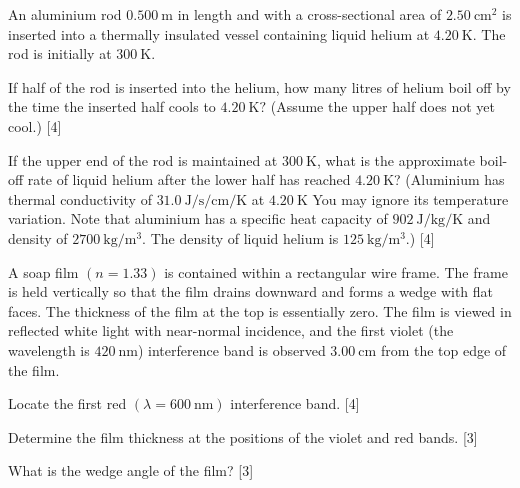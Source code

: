 \begin{problem}
    An aluminium rod $\qty{0.500}{\m}$ in length and with a cross-sectional area of $\qty{2.50}{\square\cm}$ is inserted into a thermally insulated vessel containing liquid helium at $\qty{4.20}{\K}$. The rod is initially at $\qty{300}{\K}$.
    \begin{subproblem}
        If half of the rod is inserted into the helium, how many litres of helium boil off by the time the inserted half cools to $4.20 \mathrm{~K} ?$ (Assume the upper half does not yet cool.)
    \hfill{[4]}\end{subproblem}
    \begin{subproblem}
        If the upper end of the rod is maintained at $\qty{300}{\K}$, what is the approximate boil-off rate of liquid helium after the lower half has reached $\qty{4.20}{\K}$? (Aluminium has thermal conductivity of $\qty{31.0}{\J\per\s\per\cm\per\K}$ at $\qty{4.20}{\K}$ You may ignore its temperature variation. Note that aluminium has a specific heat capacity of $\qty{902}{\J\per\kg\per\K}$ and density of $\qty{2700}{\kg\per\cubic\m}$. The density of liquid helium is $\qty{125}{\kg\per\cubic\m}$.)
    \hfill{[4]}\end{subproblem}
\end{problem}

\begin{problem}
    A soap film $(n=1.33)$ is contained within a rectangular wire frame. The frame is held vertically so that the film drains downward and forms a wedge with flat faces. The thickness of the film at the top is essentially zero. The film is viewed in reflected white light with near-normal incidence, and the first violet (the wavelength is $\qty{420}{\nm}$) interference band is observed $\qty{3.00}{\cm}$ from the top edge of the film.
    \begin{subproblem}
        Locate the first red $(\lambda=\qty{600}{\nm})$ interference band.
    \hfill{[4]}\end{subproblem}
    \begin{subproblem}
        Determine the film thickness at the positions of the violet and red bands.
    \hfill{[3]}\end{subproblem}
    \begin{subproblem}
        What is the wedge angle of the film?
    \hfill{[3]}\end{subproblem}
\end{problem}

